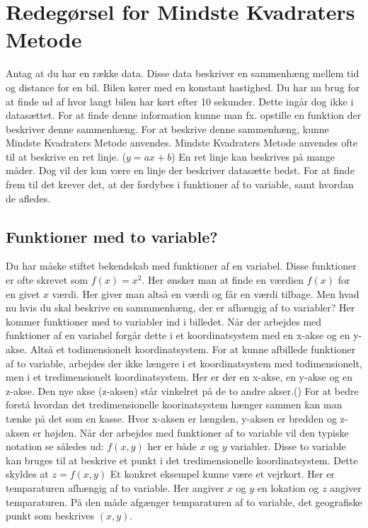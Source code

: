 \section{Redegørsel for Mindste Kvadraters Metode}
Antag at du har en række data. Disse data beskriver en sammenhæng mellem tid og distance for en bil. Bilen kører med en konstant hastighed. Du har nu brug for at finde ud af hvor langt bilen har kørt efter 10 sekunder. Dette ingår dog ikke i datasættet. For at finde denne information kunne man fx. opstille en funktion der beskriver denne sammenhæng. For at beskrive denne sammenhæng, kunne Mindste Kvadraters Metode anvendes. Mindste Kvadraters Metode anvendes ofte til at beskrive en ret linje. (\begin{math}y = ax + b\end{math}) En ret linje kan beskrives på mange måder. Dog vil der kun være en linje der beskriver datasætte bedst. For at finde frem til det krever det, at der fordybes i funktioner af to variable, samt hvordan de afledes.


\subsection{Funktioner med to variable?}\label{sec:FunktionerMedToVariable}
Du har måske stiftet bekendskab med funktioner af en variabel. Disse funktioner er ofte skrevet som \begin{math}f(x) = x^2\end{math}. Her ønsker man at finde en værdien $f(x)$ for en givet $x$ værdi. Her giver man altså en værdi og får en værdi tilbage. Men hvad nu hvis du skal beskrive en sammmenhæng, der er afhængig af to variabler? Her kommer funktioner med to variabler ind i billedet. Når der arbejdes med funktioner af en variabel forgår dette i et koordinatsystem med en x-akse og en y-akse. Altså et todimensionelt koordinatsystem. For at kunne afbillede funktioner af to variable, arbejdes der ikke længere i et koordinatsystem med todimensionelt, men i et tredimensionelt koordinatsystem. Her er der en x-akse, en y-akse og en z-akse. Den nye akse (z-aksen) står vinkelret på de to andre akser.(\cite[246-248]{funktionrAfToVariable}) For at bedre forstå hvordan det tredimensionelle  koorinatsystem hænger sammen kan man tænke på det som en kasse. Hvor x-aksen er længden, y-aksen er bredden og z-aksen er højden. Når der arbejdes med funktioner af to variable vil den typiske notation se således ud: $f(x,y)$ her er både $x$ og $y$ variabler. Disse to variable kan bruges til at beskrive et punkt i det tredimensionelle koordinatsystem. Dette skyldes at $z = f(x,y)$ Et konkret eksempel kunne være et vejrkort. Her er temparaturen afhængig af to variable. Her angiver $x$ og $y$ en lokation og $z$ angiver temparaturen. På den måde afgænger temparaturen af to variable, det geografiske punkt som beskrives $(x,y)$.\\

